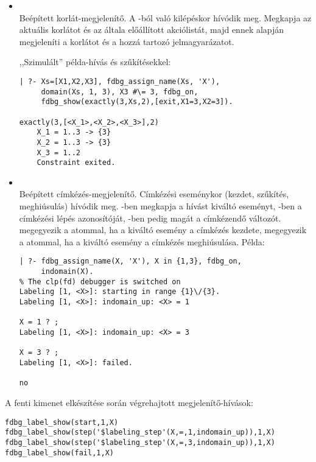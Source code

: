 \begin{itemize}
\item {} \\
Beépített korlát-megjelenítő. A -ból való kilépéskor hívódik
meg. Megkapja az aktuális korlátot és az általa előállított akciólistát, majd
ennek alapján megjeleníti a korlátot és a hozzá tartozó jelmagyarázatot. 

,,Szimulált'' példa-hívás  és  szűkítésekkel:

\begin{verbatim}
| ?- Xs=[X1,X2,X3], fdbg_assign_name(Xs, 'X'), 
     domain(Xs, 1, 3), X3 #\= 3, fdbg_on, 
     fdbg_show(exactly(3,Xs,2),[exit,X1=3,X2=3]).

exactly(3,[<X_1>,<X_2>,<X_3>],2)
    X_1 = 1..3 -> {3}
    X_2 = 1..3 -> {3}
    X_3 = 1..2
    Constraint exited.
\end{verbatim}

\item {}\\
Beépített címkézés-megjelenítő. Címkézési eseménykor (kezdet, szűkítés,
meghiúsulás) hívódik meg. -ben megkapja a hívást kiváltó
eseményt, -ben a címkézési lépés azonosítóját, -ben
pedig magát a címkézendő változót.  megegyezik a
 atommal, ha a kiváltó esemény a címkézés kezdete, megegyezik a 
atommal, ha a kiváltó esemény a címkézés meghiúsulása. Példa:

\begin{verbatim}
| ?- fdbg_assign_name(X, 'X'), X in {1,3}, fdbg_on,
     indomain(X).
% The clp(fd) debugger is switched on
Labeling [1, <X>]: starting in range {1}\/{3}.
Labeling [1, <X>]: indomain_up: <X> = 1

X = 1 ? ;
Labeling [1, <X>]: indomain_up: <X> = 3

X = 3 ? ;
Labeling [1, <X>]: failed.

no
\end{verbatim}

\end{itemize}

A fenti kimenet elkészítése során végrehajtott megjelenítő-hívások:

\begin{verbatim}
fdbg_label_show(start,1,X)
fdbg_label_show(step('$labeling_step'(X,=,1,indomain_up)),1,X)
fdbg_label_show(step('$labeling_step'(X,=,3,indomain_up)),1,X)
fdbg_label_show(fail,1,X)
\end{verbatim}


